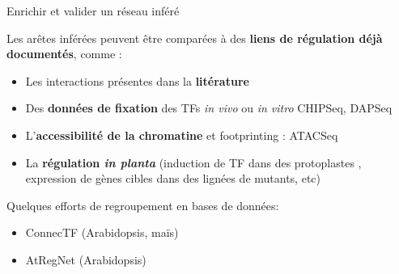 


\begin{frame}{Enrichir et valider un réseau inféré}


\small Les arêtes inférées peuvent être comparées à des \textbf{liens de régulation déjà documentés}, comme :


\begin{itemize} \small 
    \item Les interactions présentes dans la \textbf{litérature}
    \item Des \textbf{données de fixation} des TFs  \textit{in vivo} ou \textit{in vitro} CHIPSeq, DAPSeq
    \item L'\textbf{accessibilité de la chromatine} et footprinting : ATACSeq
    \item La \textbf{régulation \textit{in planta}} (induction de TF dans des protoplastes \cite{Bargmann2013}, expression de gènes cibles dans des lignées de mutants, etc) 
\end{itemize}
\vspace{-0.3cm}
\begin{block}{\small Quelques efforts de regroupement en bases de données:}
\begin{itemize}\small
    \item ConnecTF \cite{Brooks2020} (Arabidopsis, maïs)
    \item AtRegNet \cite{Palaniswamy2006} (Arabidopsis)
\end{itemize}
\end{block}
\end{frame}



